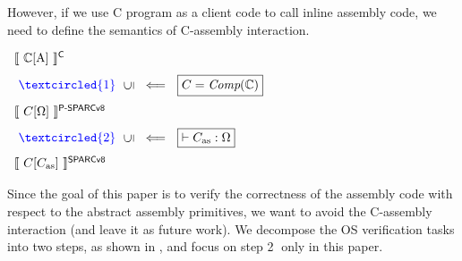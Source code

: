 However, if we use C program as a client code to
call inline assembly code, we need to define the
semantics of C-assembly interaction.
\begin{center}
    $
        \begin{array}{l}
            \semantics{\Clang[\AbsPrimC]}^{\textsf{C}}
            \\
            \\[-5pt]
            \
            {\color{blue} \textcircled{1}} \ \
            \rotatebox[origin=c]{90}{$\refine$} \ \
            \Longleftarrow \ \
            \boxed{C = \textit{Comp}(\Clang)}
            \\
            \\[-5pt]
            \semantics{\code[\hprimset]}^{\textsf{P-SPARCv8}}
            \\
            \\[-5pt]
            \
            {\color{blue} \textcircled{2}} \ \
            \rotatebox[origin=c]{90}{$\refine$} \ \
            \Longleftarrow \ \
            \boxed{\vdash\asmimp:\hprimset}
            \\
            \\[-5pt]
            \semantics{\code[\asmimp]}^{\textsf{SPARCv8}}
        \end{array}
    $
    \label{fig:idea to establish contextual refinement}
\end{center}

Since the goal of this paper is to verify the correctness of the
assembly code with respect to the abstract assembly primitives,
we want to avoid the C-assembly interaction (and leave it as
future work). We decompose the OS verification tasks into
two steps, as shown in \Fig{\ref{fig:idea to establish contextual refinement}},
and focus on step {\color{blue} \textcircled{2}} only in this paper.

